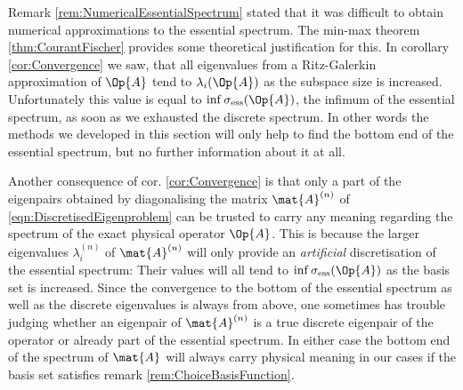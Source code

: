 \begin{rem}
Remark \vref{rem:NumericalEssentialSpectrum}
stated that it was difficult
to obtain numerical approximations to the essential spectrum.
The min-max theorem \vref{thm:CourantFischer}
provides some theoretical justification for this.
In corollary \vref{cor:Convergence} we saw,
that all eigenvalues from a Ritz-Galerkin approximation
of $\Op{A}$ tend to $\lambda_i(\Op{A})$
as the subspace size is increased.
Unfortunately this value is equal to $\inf \sigma_\text{ess}(\Op{A})$,
the infimum of the essential spectrum,
as soon as we exhausted the discrete spectrum.
In other words the methods we developed in this section
will only help to find the bottom end of the essential spectrum,
but no further information about it at all.

Another consequence of cor. \ref{cor:Convergence} is
that only a part of the eigenpairs obtained by
diagonalising the matrix $\mat{A}^{(n)}$ of \vref{eqn:DiscretisedEigenproblem}
can be trusted to carry any meaning regarding
the spectrum of the exact physical operator $\Op{A}$.
This is because the larger eigenvalues $\lambda_i^{(n)}$
of $\mat{A}^{(n)}$ will only provide an \emph{artificial}
discretisation of the essential spectrum:
Their values will all tend to $\inf \sigma_\text{ess}(\Op{A})$
as the basis set is increased.
Since the convergence to the bottom of the essential spectrum
as well as the discrete eigenvalues is always from above,
one sometimes has trouble judging whether
an eigenpair of $\mat{A}^{(n)}$
is a true discrete eigenpair of the operator or already
part of the essential spectrum.
In either case the bottom end of the spectrum of $\mat{A}$
will always carry physical meaning in our cases if the basis
set satisfies remark \vref{rem:ChoiceBasisFunction}.
\end{rem}
